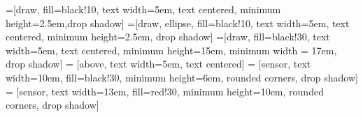 \newcommand{\mx}[1]{\mathbf{\bm{#1}}} %
\newcommand{\vc}[1]{\mathbf{\bm{#1}}} %



=[draw, fill=black!10, text width=5em,
    text centered, minimum height=2.5em,drop shadow]
=[draw, ellipse, fill=black!10, text width=5em,
    text centered, minimum height=2.5em, drop shadow]
=[draw, fill=black!30, text width=5em,
    text centered, minimum height=15em, minimum width = 17em, drop shadow]
 = [above, text width=5em, text centered]
 = [sensor, text width=10em, fill=black!30,
    minimum height=6em, rounded corners, drop shadow]
 = [sensor, text width=13em, fill=red!30,
    minimum height=10em, rounded corners, drop shadow]


\def\blockdist{1.5}
\def\edgedist{2.5}

